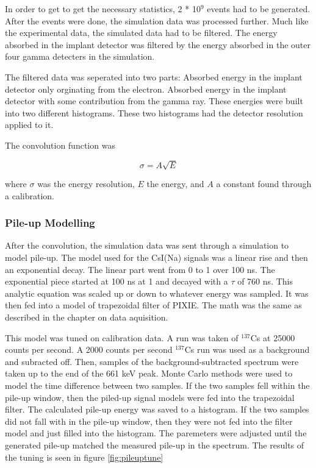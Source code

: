 In order to get to get the necessary statistics, 2 * 10$^{9}$ events had to be generated. 
After the events were done, the simulation data was processed further. 
Much like the experimental data, the simulated data had to be filtered.
The energy absorbed in the implant detector was filtered by the energy absorbed in the outer four gamma detecters in the simulation.

The filtered data was seperated into two parts:
Absorbed energy in the implant detector only orginating from the electron.
Absorbed energy in the implant detector with some contribution from the gamma ray.
These energies were built into two different histograms.
These two histograms had the detector resolution applied to it. 

The convolution function was

\begin{equation}
	\sigma = A\sqrt{E}
	\label{eq:convo}
\end{equation}

where $\sigma$ was the energy resolution, $E$ the energy, and $A$ a constant found through a calibration.

\subsubsection{Pile-up Modelling}
After the convolution, the simulation data was sent through a simulation to model pile-up.
The model used for the CsI(Na) signals was a linear rise and then an exponential decay.
The linear part went from 0 to 1 over 100 ns. 
The exponential piece started at 100 ns at 1 and decayed with a $\tau$ of 760 ns.
This analytic equation was scaled up or down to whatever energy was sampled.
It was then fed into a model of trapezoidal filter of PIXIE. 
The math was the same as described in the chapter on data aquisition.


This model was tuned on calibration data. 
A run was taken of $^{137}$Cs at 25000 counts per second.
A 2000 counts per second $^{137}$Cs run was used as a background and subracted off.
Then, samples of the background-subtracted spectrum were taken up to the end of the 661 keV peak.
Monte Carlo methods were used to model the time difference between two samples.
If the two samples fell within the pile-up window, then the piled-up signal models were fed into the trapezoidal filter.
The calculated pile-up energy was saved to a histogram.
If the two samples did not fall with in the pile-up window, then they were not fed into the filter model and just filled into the histogram.
The paremeters were adjusted until the generated pile-up matched the measured pile-up in the spectrum.
The results of the tuning is seen in figure \ref{fig:pileuptune}

